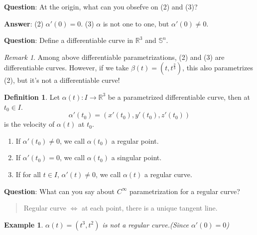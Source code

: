 \documentclass[UTF8,oneside,11pt]{book}
\theoremstyle{plain}\newtheorem{thm}{Theorem}
\theoremstyle{definition}\newtheorem{defn}[thm]{Definition}
\theoremstyle{plain}\newtheorem{axiom}[thm]{Axiom}
\theoremstyle{plain}\newtheorem{coro}[thm]{Corollary}
\theoremstyle{plain}\newtheorem{lemma}[thm]{Lemma}
\theoremstyle{plain}\newtheorem{prop}[thm]{Proposition}
\theoremstyle{plain}\newtheorem{conj}[thm]{Conjecture}
\theoremstyle{plain}\newtheorem{ques}[thm]{Problem}
\theoremstyle{plain}\newtheorem{const}[thm]{Construction}
\theoremstyle{remark}\newtheorem{notation}[thm]{Notation}
\theoremstyle{plain}\newtheorem*{app}{Application}
\theoremstyle{plain}\newtheorem*{exam}{Example}
\theoremstyle{plain}\newtheorem*{exer}{Exercise}
\theoremstyle{remark}\newtheorem*{remark}{Remark}
\theoremstyle{remark}\newtheorem*{note}{\small{Note}}
\numberwithin{equation}{section}
\numberwithin{thm}{section}
\begin{document}
\textbf{Question}: At the origin, what can you obsefve on (2) and (3)?
\par 
\textbf{Answer}:
    (2) $\alpha'\left(0\right)=0$.
    (3) $\alpha$ is not one to one, but $\alpha'\left(0\right)\neq 0$.
\par 
\textbf{Question}: Define a differentiable curve in $\mathbb{R}^3$ and $\mathbb{S}^n$.
\begin{remark}
    Among above differentiable parametrizations, (2) and (3) are differentiable curves. However, if we take $\beta\left(t\right)=(t,t^{\frac{2}{3}})$, this also parametrizes (2), but it's not a differentiable curve!
\end{remark}
\begin{defn}
    Let $\alpha\left(t\right)\colon I\to \mathbb{R}^3$ be a parametrized differentiable curve, then at $t_0\in I$.
    \[ \alpha'\left(t_0\right)=\left(x'\left(t_0\right),y'\left(t_0\right),z'\left(t_0\right)\right)\]
    is the velocity of $\alpha\left(t\right)$ at $t_0$.
    \begin{enumerate}[(1)]
        \item If $\alpha'\left(t_0\right)\neq 0$, we call $\alpha\left(t_0\right)$ a regular point.
        \item If $\alpha'\left(t_0\right) = 0$, we call $\alpha\left(t_0\right)$ a singular point.
        \item If for all $t\in I$, $\alpha'\left(t\right)\neq 0$, we call $\alpha\left(t\right)$ a regular curve.
    \end{enumerate}
\end{defn}
\textbf{Question}: What can you say about $C^\infty$ parametrization for a regular curve?
\begin{quotation}
    Regular curve $\Longleftrightarrow $ at each point, there is a unique tangent line.
\end{quotation}
\begin{exam}
    $\alpha\left(t\right)=\left(t^3,t^2\right)$ is not a regular curve.(Since $\alpha'\left(0\right)=0$)
    \begin{figure}[H]\centering
    \end{figure}
\end{exam}
\end{document}
